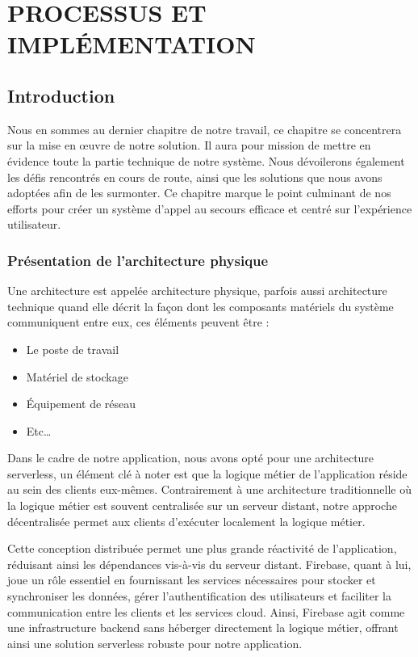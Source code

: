 \chapter{PROCESSUS ET IMPLÉMENTATION}

\section{Introduction}
Nous en sommes au dernier chapitre de notre travail, ce chapitre se concentrera sur la mise en œuvre de notre solution. Il aura pour mission de mettre en évidence toute la partie technique de notre système. Nous dévoilerons également les défis rencontrés en cours de route, ainsi que les solutions que nous avons adoptées afin de les surmonter. Ce chapitre marque le point culminant de nos efforts pour créer un système d'appel au secours efficace et centré sur l'expérience utilisateur.

\subsection{Présentation de l'architecture physique}
Une architecture est appelée architecture physique, parfois aussi architecture technique quand elle décrit la façon dont les composants matériels du système communiquent entre eux, ces éléments peuvent être : 

\begin{itemize}
	\item Le poste de travail
	\item Matériel de stockage
	\item Équipement de réseau
	\item Etc…
\end{itemize}

Dans le cadre de notre application, nous avons opté pour une architecture serverless, un élément clé à noter est que la logique métier de l'application réside au sein des clients eux-mêmes. Contrairement à une architecture traditionnelle où la logique métier est souvent centralisée sur un serveur distant, notre approche décentralisée permet aux clients d'exécuter localement la logique métier. 

Cette conception distribuée permet une plus grande réactivité de l'application, réduisant ainsi les dépendances vis-à-vis du serveur distant. Firebase, quant à lui, joue un rôle essentiel en fournissant les services nécessaires pour stocker et synchroniser les données, gérer l'authentification des utilisateurs et faciliter la communication entre les clients et les services cloud. Ainsi, Firebase agit comme une infrastructure backend sans héberger directement la logique métier, offrant ainsi une solution serverless robuste pour notre application.

